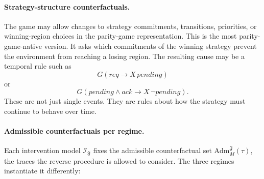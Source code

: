 \documentclass[11pt]{article}
\theoremstyle{remark}
\newcommand{\Frame}{\mathfrak{F}}
\newcommand{\Adm}{\mathrm{Adm}}
\begin{document}
\paragraph{Strategy-structure counterfactuals.}
The game may allow changes to strategy commitments, transitions, priorities, or
winning-region choices in the parity-game representation. This is the most
parity-game-native version. It asks which commitments of the winning strategy
prevent the environment from reaching a losing region. The resulting cause may
be a temporal rule such as
\[
  G(req \rightarrow X\,pending)
\]
or
\[
  G(pending \land ack \rightarrow X\,\neg pending).
\]
These are not just single events. They are rules about how the strategy must
continue to behave over time.

\paragraph{Admissible counterfactuals per regime.}
Each intervention model \(\mathcal{I}_{\Frame}\) fixes the admissible
counterfactual set \(\Adm_M^{\Frame}(\tau)\), the traces the reverse procedure
is allowed to consider. The three regimes instantiate it differently:
\end{document}
